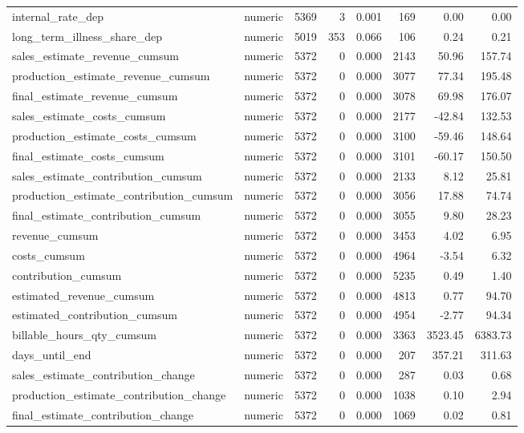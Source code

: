 \begin{landscape}
\begin{longtable}[t]{llrrrrrr}
internal\_rate\_dep & numeric & 5369 & 3 & 0.001 & 169 & 0.00 & 0.00\\
long\_term\_illness\_share\_dep & numeric & 5019 & 353 & 0.066 & 106 & 0.24 & 0.21\\
sales\_estimate\_revenue\_cumsum & numeric & 5372 & 0 & 0.000 & 2143 & 50.96 & 157.74\\
production\_estimate\_revenue\_cumsum & numeric & 5372 & 0 & 0.000 & 3077 & 77.34 & 195.48\\
final\_estimate\_revenue\_cumsum & numeric & 5372 & 0 & 0.000 & 3078 & 69.98 & 176.07\\
sales\_estimate\_costs\_cumsum & numeric & 5372 & 0 & 0.000 & 2177 & -42.84 & 132.53\\
production\_estimate\_costs\_cumsum & numeric & 5372 & 0 & 0.000 & 3100 & -59.46 & 148.64\\
final\_estimate\_costs\_cumsum & numeric & 5372 & 0 & 0.000 & 3101 & -60.17 & 150.50\\
sales\_estimate\_contribution\_cumsum & numeric & 5372 & 0 & 0.000 & 2133 & 8.12 & 25.81\\
production\_estimate\_contribution\_cumsum & numeric & 5372 & 0 & 0.000 & 3056 & 17.88 & 74.74\\
final\_estimate\_contribution\_cumsum & numeric & 5372 & 0 & 0.000 & 3055 & 9.80 & 28.23\\
revenue\_cumsum & numeric & 5372 & 0 & 0.000 & 3453 & 4.02 & 6.95\\
costs\_cumsum & numeric & 5372 & 0 & 0.000 & 4964 & -3.54 & 6.32\\
contribution\_cumsum & numeric & 5372 & 0 & 0.000 & 5235 & 0.49 & 1.40\\
estimated\_revenue\_cumsum & numeric & 5372 & 0 & 0.000 & 4813 & 0.77 & 94.70\\
estimated\_contribution\_cumsum & numeric & 5372 & 0 & 0.000 & 4954 & -2.77 & 94.34\\
billable\_hours\_qty\_cumsum & numeric & 5372 & 0 & 0.000 & 3363 & 3523.45 & 6383.73\\
days\_until\_end & numeric & 5372 & 0 & 0.000 & 207 & 357.21 & 311.63\\
sales\_estimate\_contribution\_change & numeric & 5372 & 0 & 0.000 & 287 & 0.03 & 0.68\\
production\_estimate\_contribution\_change & numeric & 5372 & 0 & 0.000 & 1038 & 0.10 & 2.94\\
final\_estimate\_contribution\_change & numeric & 5372 & 0 & 0.000 & 1069 & 0.02 & 0.81\\

\end{longtable}
\end{landscape}
